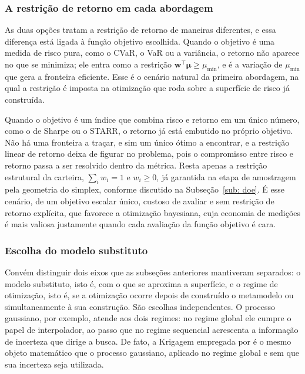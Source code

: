 \documentclass[12pt,a4paper]{article}
\begin{document}
\subsubsection{A restrição de retorno em cada abordagem}

As duas opções tratam a restrição de retorno de maneiras diferentes, e essa diferença está ligada à função objetivo escolhida. Quando o objetivo é uma medida de risco pura, como o CVaR, o VaR ou a variância, o retorno não aparece no que se minimiza; ele entra como a restrição $\mathbf{w}^\top \boldsymbol{\mu} \geq \mu_{\min}$, e é a variação de $\mu_{\min}$ que gera a fronteira eficiente. Esse é o cenário natural da primeira abordagem, na qual a restrição é imposta na otimização que roda sobre a superfície de risco já construída.

Quando o objetivo é um índice que combina risco e retorno em um único número, como o de Sharpe ou o STARR, o retorno já está embutido no próprio objetivo. Não há uma fronteira a traçar, e sim um único ótimo a encontrar, e a restrição linear de retorno deixa de figurar no problema, pois o compromisso entre risco e retorno passa a ser resolvido dentro da métrica. Resta apenas a restrição estrutural da carteira, $\sum_i w_i = 1$ e $w_i \geq 0$, já garantida na etapa de amostragem pela geometria do simplex, conforme discutido na Subseção~\ref{sub: doe}. É esse cenário, de um objetivo escalar único, custoso de avaliar e sem restrição de retorno explícita, que favorece a otimização bayesiana, cuja economia de medições é mais valiosa justamente quando cada avaliação da função objetivo é cara.

\subsubsection{Escolha do modelo substituto}

Convém distinguir dois eixos que as subseções anteriores mantiveram separados: o modelo substituto, isto é, com o que se aproxima a superfície, e o regime de otimização, isto é, se a otimização ocorre depois de construído o metamodelo ou simultaneamente à sua construção. São escolhas independentes. O processo gaussiano, por exemplo, atende aos dois regimes: no regime global ele cumpre o papel de interpolador, ao passo que no regime sequencial acrescenta a informação de incerteza que dirige a busca. De fato, a Krigagem empregada por  é o mesmo objeto matemático que o processo gaussiano, aplicado no regime global e sem que sua incerteza seja utilizada.
\end{document}
